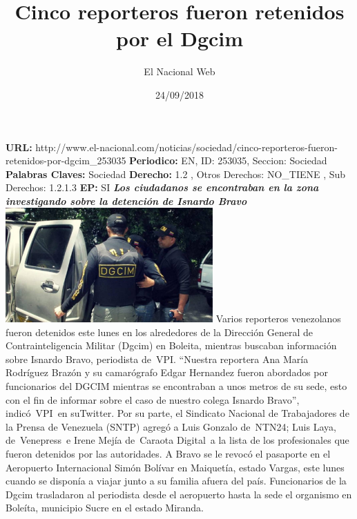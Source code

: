 \documentclass{article}%
\title{\textbf{Cinco reporteros fueron retenidos por el Dgcim}}%
\author{El Nacional Web}%
\date{24/09/2018}%
\begin{document}
%
\normalsize%
\maketitle%
\textbf{URL: }%
http://www.el{-}nacional.com/noticias/sociedad/cinco{-}reporteros{-}fueron{-}retenidos{-}por{-}dgcim\_253035\newline%
%
\textbf{Periodico: }%
EN, %
ID: %
253035, %
Seccion: %
Sociedad\newline%
%
\textbf{Palabras Claves: }%
Sociedad\newline%
%
\textbf{Derecho: }%
1.2%
, Otros Derechos: %
NO\_TIENE%
, Sub Derechos: %
1.2.1.3%
\newline%
%
\textbf{EP: }%
SI\newline%
\newline%
%
\textbf{\textit{Los ciudadanos se encontraban en la zona investigando sobre la detención de Isnardo Bravo}}%
\newline%
\newline%
%
\includegraphics[width=300px]{151.jpg}%
\newline%
%
Varios reporteros venezolanos fueron detenidos este lunes en los alrededores de la Dirección General de Contrainteligencia Militar (Dgcim) en Boleita, mientras buscaban información sobre Isnardo Bravo, periodista de~VPI.%
\newline%
%
“Nuestra reportera Ana María Rodríguez Brazón y su camarógrafo Edgar Hernandez fueron abordados por funcionarios del DGCIM mientras se encontraban a unos metros de su sede, esto con el fin de informar sobre el caso de nuestro colega Isnardo Bravo”, indicó~VPI~en suTwitter.%
\newline%
%
Por su parte, el Sindicato Nacional de Trabajadores de la Prensa de Venezuela (SNTP) agregó a Luis Gonzalo de~NTN24; Luis Laya, de~Venepress~e Irene Mejía de~Caraota Digital~a la lista de los profesionales que fueron detenidos por las autoridades.%
\newline%
%
A Bravo se le revocó el pasaporte en el Aeropuerto Internacional Simón Bolívar en Maiquetía, estado Vargas, este lunes cuando se disponía a viajar junto a su familia afuera del país.%
\newline%
%
Funcionarios de la Dgcim trasladaron al periodista desde el aeropuerto hasta la sede el organismo en Boleíta, municipio Sucre en el estado Miranda.%
\newline%
%
\end{document}
